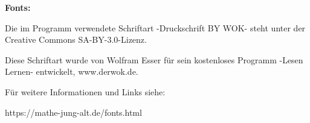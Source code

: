 \newpage

{\bf Fonts:} \par

Die im Programm verwendete Schriftart -Druckschrift BY WOK- steht unter der Creative Commons SA-BY-3.0-Lizenz.

Diese Schriftart wurde von Wolfram Esser für sein kostenloses Programm  -Lesen Lernen- entwickelt, www.derwok.de.

Für weitere Informationen und Links siehe:\par

https://mathe-jung-alt.de/fonts.html